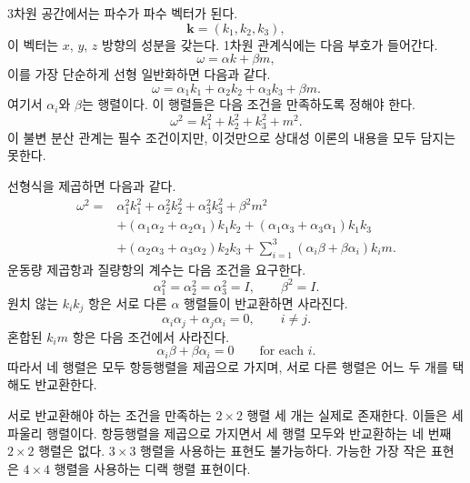 3차원 공간에서는 파수가 파수 벡터가 된다.
\begin{equation}
\mathbf{k}=(k_1,k_2,k_3),
\end{equation}
이 벡터는 \(x\), \(y\), \(z\) 방향의 성분을 갖는다. 1차원 관계식에는 다음 부호가 들어간다.
\begin{equation}
\omega=\alpha k+\beta m,
\end{equation}
이를 가장 단순하게 선형 일반화하면 다음과 같다.
\begin{equation}
\omega
=
\alpha_1 k_1+\alpha_2 k_2+\alpha_3 k_3+\beta m.
\end{equation}
여기서 \(\alpha_i\)와 \(\beta\)는 행렬이다. 이 행렬들은 다음 조건을 만족하도록 정해야 한다.
\begin{equation}
\omega^2=k_1^2+k_2^2+k_3^2+m^2.
\end{equation}
이 불변 분산 관계는 필수 조건이지만, 이것만으로 상대성 이론의 내용을 모두 담지는 못한다.

선형식을 제곱하면 다음과 같다.
\begin{align}
\omega^2
={}&
\alpha_1^2k_1^2+\alpha_2^2k_2^2+\alpha_3^2k_3^2+\beta^2m^2
\nonumber\\
&+(\alpha_1\alpha_2+\alpha_2\alpha_1)k_1k_2
+(\alpha_1\alpha_3+\alpha_3\alpha_1)k_1k_3
\nonumber\\
&+(\alpha_2\alpha_3+\alpha_3\alpha_2)k_2k_3
+\sum_{i=1}^{3}(\alpha_i\beta+\beta\alpha_i)k_i m.
\end{align}
운동량 제곱항과 질량항의 계수는 다음 조건을 요구한다.
\begin{equation}
\alpha_1^2=\alpha_2^2=\alpha_3^2=I,
\qquad
\beta^2=I.
\end{equation}
원치 않는 \(k_i k_j\) 항은 서로 다른 \(\alpha\) 행렬들이 반교환하면 사라진다.
\begin{equation}
\alpha_i\alpha_j+\alpha_j\alpha_i=0,
\qquad i\neq j.
\end{equation}
혼합된 \(k_i m\) 항은 다음 조건에서 사라진다.
\begin{equation}
\alpha_i\beta+\beta\alpha_i=0
\qquad
\text{for each }i.
\end{equation}
따라서 네 행렬은 모두 항등행렬을 제곱으로 가지며, 서로 다른 행렬은 어느 두 개를 택해도 반교환한다.

서로 반교환해야 하는 조건을 만족하는 \(2\times2\) 행렬 세 개는 실제로 존재한다. 이들은 세 파울리 행렬이다. 항등행렬을 제곱으로 가지면서 세 행렬 모두와 반교환하는 네 번째 \(2\times2\) 행렬은 없다. \(3\times3\) 행렬을 사용하는 표현도 불가능하다. 가능한 가장 작은 표현은 \(4\times4\) 행렬을 사용하는 디랙 행렬 표현이다.

